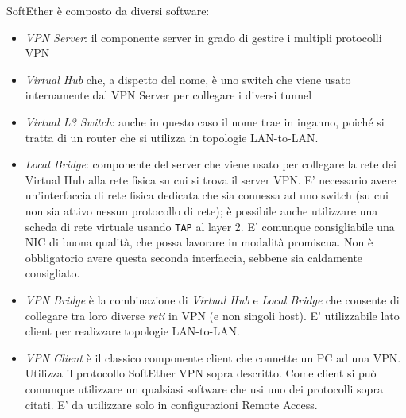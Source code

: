 SoftEther è composto da diversi software:
\begin{itemize}
  \item \textit{VPN Server}: il componente server in grado di gestire i multipli
  protocolli VPN
  \item \textit{Virtual Hub} che, a dispetto del nome, è uno switch che viene usato internamente
  dal VPN Server per collegare i diversi tunnel
  \item \textit{Virtual L3 Switch}: anche in questo caso il nome trae in inganno, poiché si tratta di un
  router che si utilizza in topologie LAN-to-LAN.
  \item \textit{Local Bridge}: componente del server che viene usato per collegare la rete dei Virtual Hub
  alla rete fisica su cui si trova il server VPN. E' necessario avere un'interfaccia di rete
  fisica dedicata che sia connessa ad uno switch (su cui non sia attivo nessun protocollo di rete);
  è possibile anche utilizzare una scheda di rete virtuale usando \texttt{TAP} al layer 2.
  E' comunque consigliabile
  una NIC di buona qualità, che possa lavorare in modalità promiscua. Non è obbligatorio
  avere questa seconda interfaccia, sebbene sia caldamente consigliato.
  \item \textit{VPN Bridge} è la combinazione di \textit{Virtual Hub} e \textit{Local Bridge} che consente
  di collegare tra loro diverse \textit{reti} in VPN (e non singoli host). E' utilizzabile
  lato client per realizzare topologie LAN-to-LAN.
  \item \textit{VPN Client} è il classico componente client che connette un PC ad una VPN. Utilizza il
  protocollo SoftEther VPN sopra descritto. Come client si può comunque utilizzare un qualsiasi software che
  usi uno dei protocolli sopra citati. E' da utilizzare solo in configurazioni Remote Access.
\end{itemize}


